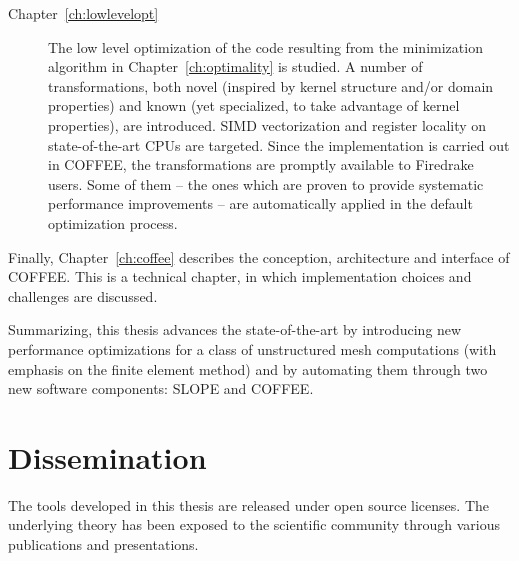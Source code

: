 \begin{description}
\item[Chapter~\ref{ch:lowlevelopt}] The low level optimization of the code resulting from the minimization algorithm in Chapter~\ref{ch:optimality} is studied. A number of transformations, both novel (inspired by kernel structure and/or domain properties) and known (yet specialized, to take advantage of kernel properties), are introduced. SIMD vectorization and register locality on state-of-the-art CPUs are targeted. Since the implementation is carried out in COFFEE, the transformations are promptly available to Firedrake users. Some of them -- the ones which are proven to provide systematic performance improvements -- are automatically applied in the default optimization process.

\end{description}

Finally, Chapter~\ref{ch:coffee} describes the conception, architecture and interface of COFFEE. This is a technical chapter, in which implementation choices and challenges are discussed.

Summarizing, this thesis advances the state-of-the-art by introducing new performance optimizations for a class of unstructured mesh computations (with emphasis on the finite element method) and by automating them through two new software components: SLOPE and COFFEE.


\section{Dissemination}
The tools developed in this thesis are released under open source licenses. The underlying theory has been exposed to the scientific community through various publications and presentations.

